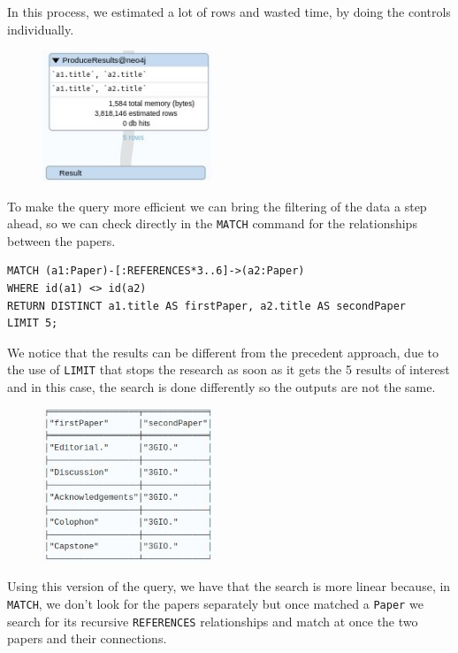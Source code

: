 \begin{enumerate}
    In this process, we estimated a lot of rows and wasted time, by doing the controls individually.
    \begin{figure}[H]
        \begin{center}
            \includegraphics[width=0.45\textwidth]{Images/result_query8neo4j1}
            \label{fig:result_query8neo4j1}%
        \end{center}
    \end{figure}
    To make the query more efficient we can bring the filtering of the data a step ahead, so we can check directly in the \verb|MATCH| command for the relationships between the papers.
    \begin{lstlisting}[label={lst:query8neo4j2}]
MATCH (a1:Paper)-[:REFERENCES*3..6]->(a2:Paper)
WHERE id(a1) <> id(a2)
RETURN DISTINCT a1.title AS firstPaper, a2.title AS secondPaper
LIMIT 5;
    \end{lstlisting}
    We notice that the results can be different from the precedent approach, due to the use of \verb|LIMIT| that stops the research as soon as it gets the 5 results of interest and in this case, the search is done differently so the outputs are not the same.
    \begin{figure}[H]
        \begin{center}
            \includegraphics[width=0.45\textwidth]{Images/query8neo4j2}
            \label{fig:query8neo4j2}%
        \end{center}
    \end{figure}
    Using this version of the query, we have that the search is more linear because, in \verb|MATCH|, we don't look for the papers separately but once matched a \verb|Paper| we search for its recursive \verb|REFERENCES| relationships and match at once the two papers and their connections.

\end{enumerate}
